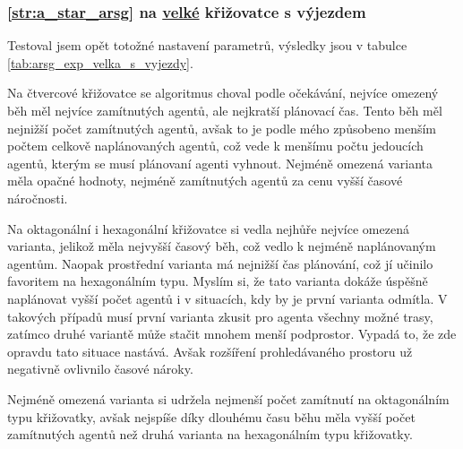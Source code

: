 

\subsubsection{\ref{str:a_star_arsg} na \hyperref[par:data_velka]{velké} křižovatce s výjezdem}
\label{subsubsec:exp_arsg_velka_krizovatka_s_vyjezdem}

Testoval jsem opět totožné nastavení parametrů, výsledky jsou v tabulce \ref{tab:arsg_exp_velka_s_vyjezdy}.

Na čtvercové křižovatce se algoritmus choval podle očekávání, nejvíce omezený běh měl nejvíce zamítnutých agentů,
ale nejkratší plánovací čas.
Tento běh měl nejnižší počet zamítnutých agentů,
avšak to je podle mého způsobeno menším počtem celkově naplánovaných agentů,
což vede k menšímu počtu jedoucích agentů, kterým se musí plánovaní agenti vyhnout.
Nejméně omezená varianta měla opačné hodnoty, nejméně zamítnutých agentů za cenu vyšší časové náročnosti.

Na oktagonální i hexagonální křižovatce si vedla nejhůře nejvíce omezená varianta,
jelikož měla nejvyšší časový běh, což vedlo k nejméně naplánovaným agentům.
Naopak prostřední varianta má nejnižší čas plánování, což jí učinilo favoritem na hexagonálním typu.
Myslím si, že tato varianta dokáže úspěšně naplánovat vyšší počet agentů i v situacích,
kdy by je první varianta odmítla.
V takových případů musí první varianta zkusit pro agenta všechny možné trasy,
zatímco druhé variantě může stačit mnohem menší podprostor.
Vypadá to, že zde opravdu tato situace nastává.
Avšak rozšíření prohledávaného prostoru už negativně ovlivnilo časové nároky.

Nejméně omezená varianta si udržela nejmenší počet zamítnutí na oktagonálním typu křižovatky,
avšak nejspíše díky dlouhému času běhu měla vyšší počet zamítnutých agentů
než druhá varianta na hexagonálním typu křižovatky.



